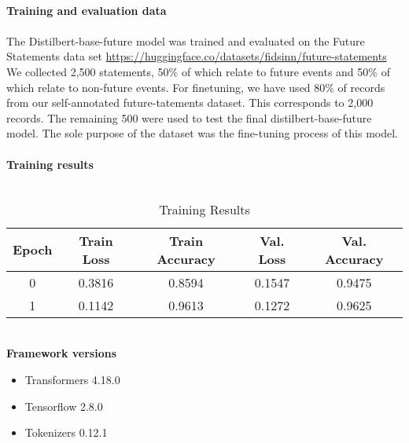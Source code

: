 \\
\textbf{Training and evaluation data}
\\
\\
The Distilbert-base-future model was trained and evaluated on the Future Statements data set \url{https://huggingface.co/datasets/fidsinn/future-statements}
We collected 2,500 statements, 50\% of which relate to future events and 50\% of which relate to non-future events.
For finetuning, we have used 80\% of records from our self-annotated future-tatements dataset. This corresponds to 2,000 records.
The remaining 500 were used to test the final distilbert-base-future model.
The sole purpose of the dataset was the fine-tuning process of this model.
\\
\\
\textbf{Training results}
\\
\\
\begin{table}[ht]
    \scriptsize
    \setlength\tabcolsep{10pt} %
    \footnotesize\centering
    \begin{tabular}{ccccc}
        \toprule
        \textbf{Epoch} & \textbf{Train Loss} & \textbf{Train Accuracy} & \textbf{Val. Loss} & \textbf{Val. Accuracy} \\
        \midrule
        0 & 0.3816 & 0.8594 & 0.1547 & 0.9475 \\
        1 & 0.1142 & 0.9613 & 0.1272 & 0.9625 \\
        \bottomrule
    \end{tabular}
    \caption{\label{future-model-train}
    Training Results
    }
\end{table}
%
%
\\
\textbf{Framework versions}
\begin{itemize}
    \item Transformers 4.18.0
    \item Tensorflow 2.8.0
    \item Tokenizers 0.12.1
\end{itemize}%
